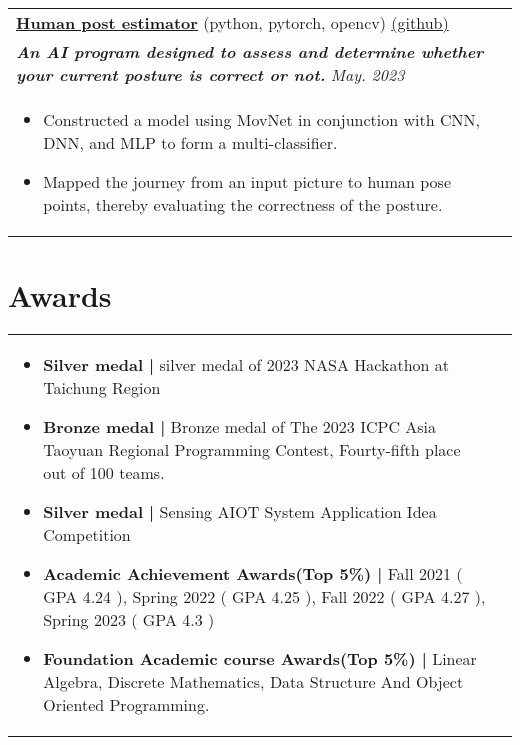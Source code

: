 \documentclass[a4paper,8pt]{article}
\begin{document}
\begin{tabularx}{\linewidth}{ @{}l r@{} }
\color[HTML]{0000cd} \textbf{\uline{\href{https://github.com/r1407p/Human-pose-estimation}{Human post estimator}}} \color[HTML]{371e77} (python, pytorch, opencv) \hfill \color[HTML]{0000cd}\href{https://github.com/r1407p/Human-pose-estimation}{ (github)} \\
\color[HTML]{371e77}\textbf{\textit{An AI program designed to assess and determine whether your current posture is correct or not. }} \hfill \color[HTML]{4B28A4} \textit{May. 2023} \\[2pt]
\begin{minipage}[t]{\linewidth}
    \begin{itemize}[nosep,after=\strut, leftmargin=2em, itemsep=2pt]
        \item Constructed a model using MovNet in conjunction with CNN, DNN, and MLP to form a multi-classifier.
        \item Mapped the journey from an input picture to human pose points, thereby evaluating the correctness of the posture.
    \end{itemize}
    \end{minipage}
\end{tabularx}
\section{Awards}
\begin{tabularx}{\linewidth}{ @{}l r@{} }
\begin{minipage}[t]{\linewidth}
    \begin{itemize}[nosep,after=\strut, leftmargin=2em, itemsep=2pt]
        \item \textbf{Silver medal |} silver medal of  2023 NASA Hackathon at Taichung Region 
        \item \textbf{Bronze medal |} Bronze medal of The 2023 ICPC Asia Taoyuan Regional Programming Contest, Fourty-fifth place out of 100 teams. 
        \item \textbf{Silver medal |} Sensing AIOT System Application Idea Competition
        \item \textbf{Academic Achievement Awards(Top 5\%) | }  Fall 2021 ( GPA 4.24 ), Spring 2022 ( GPA 4.25 ), Fall 2022 ( GPA 4.27 ), Spring 2023 ( GPA 4.3 )
        \item  \textbf{Foundation Academic course Awards(Top 5\%) |} Linear Algebra, Discrete Mathematics, Data Structure And Object Oriented Programming.        
    \end{itemize}
\end{minipage}
\end{tabularx}
\end{document}
